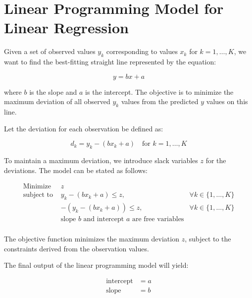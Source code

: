 \documentclass{article}
\begin{document}
\section*{Linear Programming Model for Linear Regression}

Given a set of observed values \( y_k \) corresponding to values \( x_k \) for \( k = 1, \ldots, K \), we want to find the best-fitting straight line represented by the equation:

\[
y = bx + a
\]

where \( b \) is the slope and \( a \) is the intercept. The objective is to minimize the maximum deviation of all observed \( y_k \) values from the predicted \( y \) values on this line.

Let the deviation for each observation be defined as:

\[
d_k = y_k - (bx_k + a) \quad \text{for } k = 1, \ldots, K
\]

To maintain a maximum deviation, we introduce slack variables \( z \) for the deviations. The model can be stated as follows:

\begin{align*}
\text{Minimize } & z \\
\text{subject to } & y_k - (bx_k + a) \leq z, & \forall k \in \{1, \ldots, K\} \\
                   & -(y_k - (bx_k + a)) \leq z, & \forall k \in \{1, \ldots, K\} \\
                   & \text{slope } b \text{ and intercept } a \text{ are free variables} \\
\end{align*}

The objective function minimizes the maximum deviation \( z \), subject to the constraints derived from the observation values. 

The final output of the linear programming model will yield:

\[
\begin{align*}
\text{intercept} & = a \\
\text{slope} & = b
\end{align*}
\]
\end{document}
